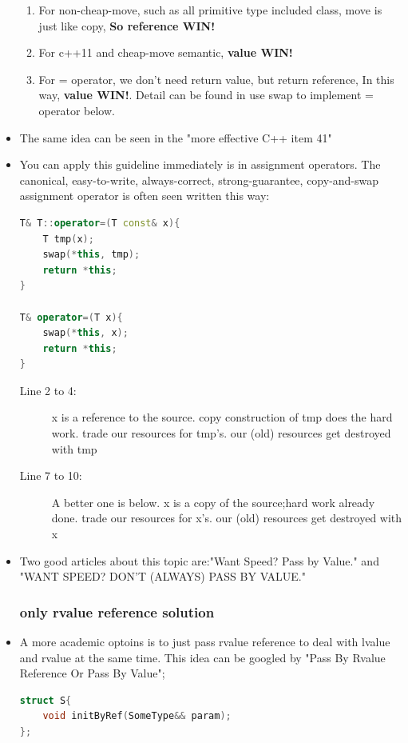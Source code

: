 \documentclass[a4paper,11pt,twoside]{book}
\begin{document}
\begin{itemize}
\begin{enumerate}
	\item For non-cheap-move, such as all primitive type included class, move is just like copy, \textbf{So reference WIN!}
	
	\item For c++11 and cheap-move semantic, \textbf{value WIN!}
	
	\item For = operator, we don't need return value, but return reference, In this way, \textbf{value WIN!}. Detail can be found in use swap to implement = operator below. 
	
\end{enumerate}


\item The same idea can be seen in the "more effective C++ item 41" 

\item You can apply this guideline immediately is in assignment operators. The canonical, easy-to-write, always-correct, strong-guarantee, copy-and-swap assignment operator is often seen written this way:
\begin{lstlisting}[frame=single, language=c++]
T& T::operator=(T const& x){ 
	T tmp(x);          
	swap(*this, tmp);  
	return *this;      
}

T& operator=(T x){ 
	swap(*this, x);
	return *this;   
}
\end{lstlisting}
\begin{description}
	\item[Line 2 to 4:] x is a reference to the source. copy construction of tmp does the hard work. trade our resources for tmp's. our (old) resources get destroyed with tmp 
	
	\item[Line 7 to 10:] A better one is below. x is a copy of the source;hard work already done. trade our resources for x's. our (old) resources get destroyed with x
\end{description}

\item Two good articles about this topic are:"Want Speed? Pass by Value." and "WANT SPEED? DON'T (ALWAYS) PASS BY VALUE."

\subsubsection{only rvalue  reference solution}
\item A more academic optoins is to just pass rvalue  reference to deal with lvalue and rvalue at the same time. This idea can be googled by "Pass By Rvalue Reference Or Pass By Value";
\begin{lstlisting}[frame=single, language=c++]
struct S{
    void initByRef(SomeType&& param);
};


\end{lstlisting}
\end{itemize}
\end{document}
